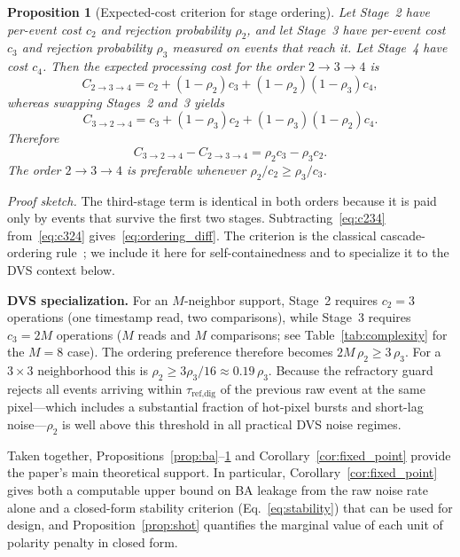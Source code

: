 \documentclass[a4paper,fleqn]{cas-dc}
\newtheorem{proposition}[theorem]{Proposition}
\begin{document}
\begin{proposition}[Expected-cost criterion for stage ordering]
\label{prop:ordering}
Let Stage~2 have per-event cost $c_2$ and rejection probability $\rho_2$, and let Stage~3 have per-event cost $c_3$ and rejection probability $\rho_3$ measured on events that reach it. Let Stage~4 have cost $c_4$. Then the expected processing cost for the order $2 \to 3 \to 4$ is
\begin{equation}
C_{2\to3\to4} = c_2 + (1-\rho_2)c_3 + (1-\rho_2)(1-\rho_3)c_4,
\label{eq:c234}
\end{equation}
whereas swapping Stages~2 and~3 yields
\begin{equation}
C_{3\to2\to4} = c_3 + (1-\rho_3)c_2 + (1-\rho_3)(1-\rho_2)c_4.
\label{eq:c324}
\end{equation}
Therefore
\begin{equation}
C_{3\to2\to4} - C_{2\to3\to4} = \rho_2 c_3 - \rho_3 c_2.
\label{eq:ordering_diff}
\end{equation}
The order $2 \to 3 \to 4$ is preferable whenever $\rho_2/c_2 \geq \rho_3/c_3$.
\end{proposition}

\noindent\textit{Proof sketch.}
The third-stage term is identical in both orders because it is paid only by events that survive the first two stages. Subtracting~\eqref{eq:c234} from~\eqref{eq:c324} gives~\eqref{eq:ordering_diff}. The criterion is the classical cascade-ordering rule~\citep{viola2001rapid,dorfman1943detection}; we include it here for self-containedness and to specialize it to the DVS context below.

\textbf{DVS specialization.}
For an $M$-neighbor support, Stage~2 requires $c_2=3$ operations (one timestamp read, two comparisons), while Stage~3 requires $c_3=2M$ operations ($M$ reads and $M$ comparisons; see Table~\ref{tab:complexity} for the $M=8$ case). The ordering preference therefore becomes $2M\,\rho_2 \geq 3\,\rho_3$. For a $3\times 3$ neighborhood this is $\rho_2 \geq 3\rho_3/16\approx 0.19\,\rho_3$. Because the refractory guard rejects all events arriving within $\tau_{\text{ref,dig}}$ of the previous raw event at the same pixel---which includes a substantial fraction of hot-pixel bursts and short-lag noise---$\rho_2$ is well above this threshold in all practical DVS noise regimes.

Taken together, Propositions~\ref{prop:ba}--\ref{prop:ordering} and Corollary~\ref{cor:fixed_point} provide the paper's main theoretical support. In particular, Corollary~\ref{cor:fixed_point} gives both a computable upper bound on BA leakage from the raw noise rate alone and a closed-form stability criterion (Eq.~\ref{eq:stability}) that can be used for design, and Proposition~\ref{prop:shot} quantifies the marginal value of each unit of polarity penalty in closed form.
\end{document}
